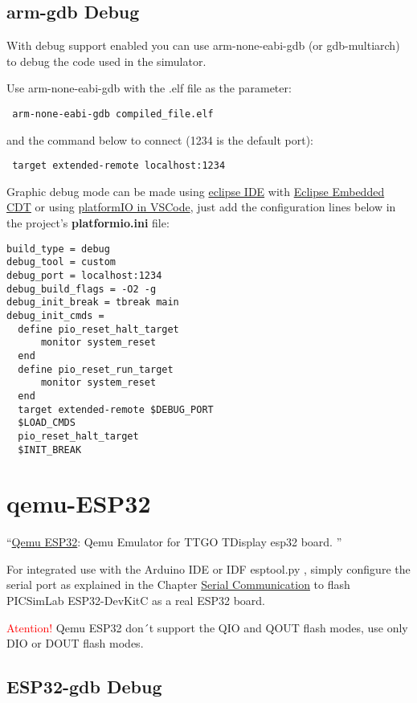  \subsection{arm-gdb Debug} \hypertarget{def:gdbarm}{}
 
 With debug support enabled you can use arm-none-eabi-gdb (or gdb-multiarch) to debug the code used in the simulator. 
 
 Use arm-none-eabi-gdb with the .elf file as the parameter:
 \begin{verbatim}
 arm-none-eabi-gdb compiled_file.elf
 \end{verbatim}
 and the command below to connect (1234 is the default port):
 \begin{verbatim}
 target extended-remote localhost:1234
 \end{verbatim}

Graphic debug mode can be made using \href{https://www.eclipse.org/}{eclipse IDE} with 
\href{https://projects.eclipse.org/projects/iot.embed-cdt}{Eclipse Embedded CDT} or using \href{https://platformio.org/}{platformIO in VSCode}, just add the configuration lines below in the project's \textbf{platformio.ini} file:
\begin{verbatim}
build_type = debug
debug_tool = custom
debug_port = localhost:1234
debug_build_flags = -O2 -g
debug_init_break = tbreak main
debug_init_cmds =
  define pio_reset_halt_target
      monitor system_reset
  end
  define pio_reset_run_target
      monitor system_reset
  end
  target extended-remote $DEBUG_PORT
  $LOAD_CMDS
  pio_reset_halt_target
  $INIT_BREAK
\end{verbatim}

\section{qemu-ESP32} \hypertarget{def:qemu-esp32}{}
 ``\href{https://github.com/a159x36/qemu}{Qemu ESP32}: Qemu Emulator for TTGO TDisplay esp32 board. ''
  
For integrated use with the Arduino IDE or IDF esptool.py , simply configure the serial port as explained 
in the Chapter \hyperlink{def:seriali}{Serial Communication} to flash PICSimLab ESP32-DevKitC as a real ESP32 board.

 \textcolor{red}{Atention!} Qemu ESP32 don´t support the QIO and QOUT flash modes, use only DIO or DOUT flash modes. 
 
\subsection{ESP32-gdb Debug} \hypertarget{def:gdbesp}{}

